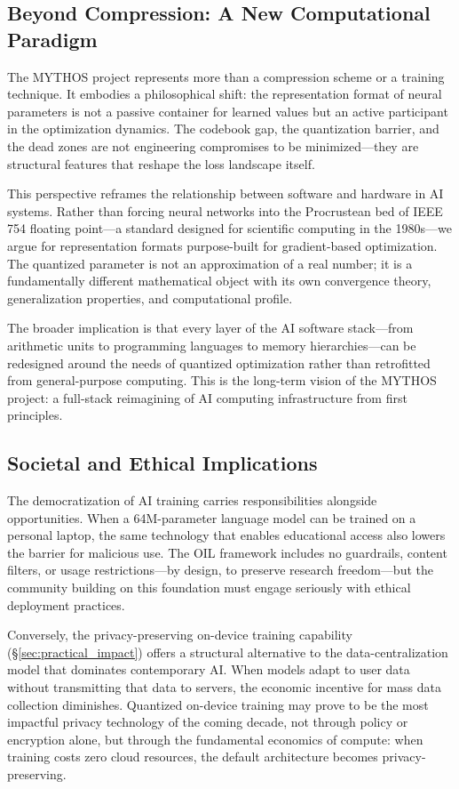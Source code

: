 \subsection{Beyond Compression: A New Computational Paradigm}

The MYTHOS project represents more than a compression scheme or a training technique. It embodies a philosophical shift: the representation format of neural parameters is not a passive container for learned values but an active participant in the optimization dynamics. The codebook gap, the quantization barrier, and the dead zones are not engineering compromises to be minimized---they are structural features that reshape the loss landscape itself.

This perspective reframes the relationship between software and hardware in AI systems. Rather than forcing neural networks into the Procrustean bed of IEEE 754 floating point---a standard designed for scientific computing in the 1980s---we argue for representation formats purpose-built for gradient-based optimization. The quantized parameter is not an approximation of a real number; it is a fundamentally different mathematical object with its own convergence theory, generalization properties, and computational profile.

The broader implication is that every layer of the AI software stack---from arithmetic units to programming languages to memory hierarchies---can be redesigned around the needs of quantized optimization rather than retrofitted from general-purpose computing. This is the long-term vision of the MYTHOS project: a full-stack reimagining of AI computing infrastructure from first principles.

\subsection{Societal and Ethical Implications}

The democratization of AI training carries responsibilities alongside opportunities. When a 64M-parameter language model can be trained on a personal laptop, the same technology that enables educational access also lowers the barrier for malicious use. The OIL framework includes no guardrails, content filters, or usage restrictions---by design, to preserve research freedom---but the community building on this foundation must engage seriously with ethical deployment practices.

Conversely, the privacy-preserving on-device training capability (\S\ref{sec:practical_impact}) offers a structural alternative to the data-centralization model that dominates contemporary AI. When models adapt to user data without transmitting that data to servers, the economic incentive for mass data collection diminishes. Quantized on-device training may prove to be the most impactful privacy technology of the coming decade, not through policy or encryption alone, but through the fundamental economics of compute: when training costs zero cloud resources, the default architecture becomes privacy-preserving.

